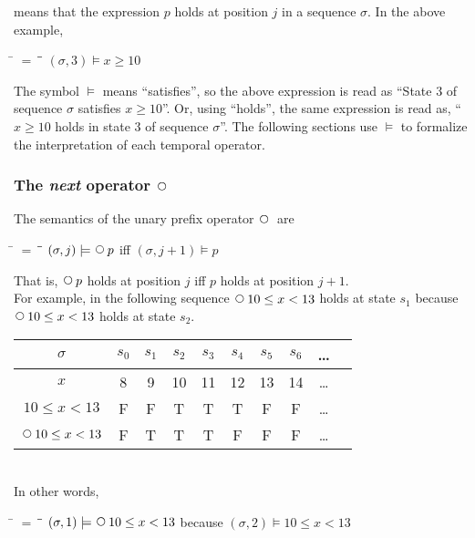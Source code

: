 \documentclass[fleqn, leqno]{article}
\newcommand{\mymathindent}{24pt}                    %
\newcommand{\Next}{\;\,\text{\raisebox{3.5pt}{\circle{6}}}}
\newcommand{\myqedtab}{\hspace{388.5pt}}              %
\begin{document}
means that the expression $p$ holds at position $j$ in a sequence $\sigma$.
In the above example,

\begin{tabbing}
\hspace{\mymathindent} \= $= \;$ \= \myqedtab \= \kill
  \> $(\sigma, 3) \models x\ge 10$
\end{tabbing}

The symbol $\models$ means ``satisfies'', so the above expression is read as
``State 3 of sequence $\sigma$ satisfies $x\ge 10$''.
Or, using ``holds'', the same expression is read as, ``$x\ge 10$ holds in state 3 of sequence $\sigma$''.
The following sections use $\models$ to formalize the interpretation of each temporal operator.

\subsubsection*{The \textit{next} operator $\Next$}

The semantics of the unary prefix operator $\Next$ are

\begin{tabbing}
\hspace{\mymathindent} \= $= \;$ \= \myqedtab \= \kill
  \> $(\sigma, j) \models \Next p$ \quad iff \quad $(\sigma, j+1) \models p$
\end{tabbing}

That is, $\Next p$ holds at position $j$ iff $p$ holds at position $j+1$.\\

For example, in the following sequence $\Next 10\le x< 13$ holds at state $s_1$ because $\Next 10\le x< 13$
holds at state $s_2$.\\

\begin{tabular}{c|ccccccccc}
  $\sigma$             & $s_0$ & $s_1$ & $s_2$ & $s_3$ & $s_4$ & $s_5$ & $s_6$ & \dots \\
  \hline
  $x$                  & 8     & 9     & 10    & 11    & 12    & 13    & 14    & \dots\\
  $10\le x< 13$        & F     & F     & T     & T     & T     & F     & F     & \dots\\
  $\Next 10\le x< 13$  & F     & T     & T     & T     & F     & F     & F     & \dots
\end{tabular}\\

In other words,

\begin{tabbing}
\hspace{\mymathindent} \= $= \;$ \= \myqedtab \= \kill
  \> $(\sigma, 1) \models \Next 10\le x< 13$ \quad because \quad $(\sigma, 2) \models 10\le x< 13$
\end{tabbing}
\end{document}
